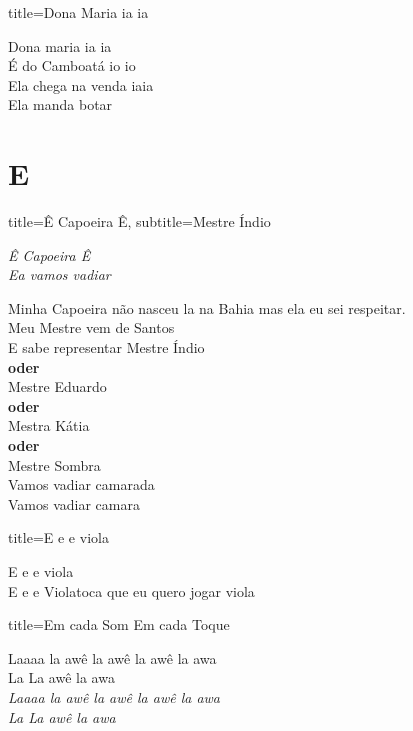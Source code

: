 \documentclass[fontsize=14pt, twoside]{scrreprt}
\newcommand\chapTOC[1]{
    \chapter*{#1}
    \addcontentsline{toc}{chapter}{#1}
    \markboth{#1}{#1}}
\begin{document}
\begin{multicols*}{2}
\begin{song}{title={Dona Maria ia ia}}
        \begin{verse*}
            Dona maria ia ia\\
            É do Camboatá io io\\
            Ela chega na venda iaia\\
            Ela manda botar\\
        \end{verse*}
\end{song}

\chapTOC{E}


\begin{song}{title={Ê Capoeira Ê}, subtitle={Mestre Índio}}
    \begin{chorus*}
        \textit{Ê Capoeira Ê \\
        Ea vamos vadiar\\}
    \end{chorus*}
        \begin{verse*}
            Minha Capoeira não nasceu la na Bahia mas ela eu sei respeitar.\\
            Meu Mestre vem de Santos\\
            E sabe representar Mestre Índio \\ 
            \textbf{oder}\\
            Mestre Eduardo\\
            \textbf{oder}\\
            Mestra Kátia\\
            \textbf{oder}\\
            Mestre Sombra\\

            Vamos vadiar camarada\\
            Vamos vadiar camara\\
        \end{verse*}
\end{song}



\begin{song}{title={E e e viola}}
        \begin{verse*}
            E e e viola\\
            E e e Violatoca que eu quero jogar viola\\
        \end{verse*}
\end{song}

\columnbreak
\begin{song}{title={Em cada Som Em cada Toque}}
    \begin{chorus*}
            Laaaa la awê la awê la awê la awa\\
            La La awê la awa\\
            \textit{Laaaa la awê la awê la awê la awa}\\
            \textit{La La awê la awa}\\
    \end{chorus*}
        \begin{verse*}


\end{verse*}
\end{song}
\end{multicols*}
\end{document}
